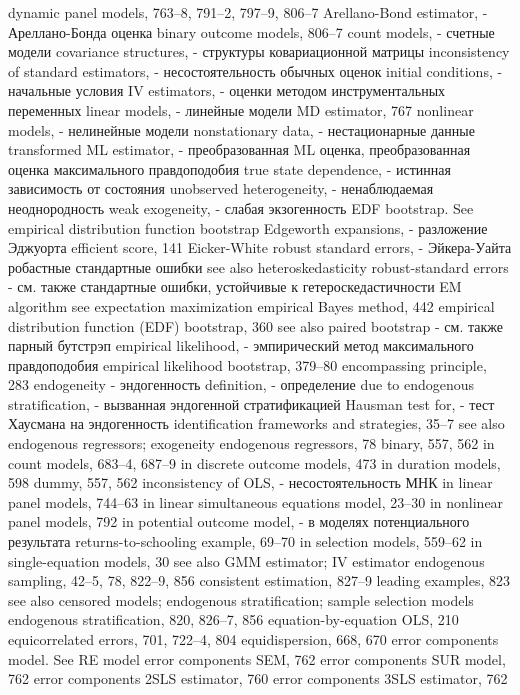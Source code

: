 dynamic panel models, 763–8, 791–2, 797–9, 806–7
Arellano-Bond estimator, - Ареллано-Бонда оценка
binary outcome models, 806–7
count models, - счетные модели
covariance structures, - структуры ковариационной матрицы
inconsistency of standard estimators, - несостоятельность обычных оценок 
initial conditions, - начальные условия
IV estimators, - оценки методом инструментальных переменных
linear models, - линейные модели
MD estimator, 767
nonlinear models, - нелинейные модели 
nonstationary data, - нестационарные данные
transformed ML estimator, - преобразованная ML оценка, преобразованная оценка максимального правдоподобия
true state dependence, - истинная зависимость от состояния
unobserved heterogeneity, - ненаблюдаемая неоднородность
weak exogeneity, - слабая экзогенность
EDF bootstrap. See empirical distribution function bootstrap
Edgeworth expansions, - разложение Эджуорта
efficient score, 141
Eicker-White robust standard errors, - Эйкера-Уайта робастные стандартные ошибки 
see also heteroskedasticity robust-standard errors - см. также стандартные ошибки, устойчивые к гетероскедастичности
EM algorithm see expectation maximization empirical Bayes method, 442
empirical distribution function (EDF) bootstrap, 360
see also paired bootstrap - см. также парный бутстрэп
empirical likelihood, - эмпирический метод максимального правдоподобия
empirical likelihood bootstrap, 379–80 
encompassing principle, 283 
endogeneity - эндогенность
definition, - определение
due to endogenous stratification, - вызванная эндогенной стратификацией
Hausman test for,  - тест Хаусмана на эндогенность
identification frameworks and strategies, 35–7
see also endogenous regressors; exogeneity endogenous regressors, 78
binary, 557, 562
in count models, 683–4, 687–9
in discrete outcome models, 473
in duration models, 598
dummy, 557, 562
inconsistency of OLS, - несостоятельность МНК
in linear panel models, 744–63
in linear simultaneous equations model, 23–30 in nonlinear panel models, 792
in potential outcome model, - в моделях потенциального результата
returns-to-schooling example, 69–70
in selection models, 559–62
in single-equation models, 30
see also GMM estimator; IV estimator
endogenous sampling, 42–5, 78, 822–9, 856 consistent estimation, 827–9
leading examples, 823
see also censored models; endogenous
stratification; sample selection models endogenous stratification, 820, 826–7, 856 equation-by-equation OLS, 210 equicorrelated errors, 701, 722–4, 804 equidispersion, 668, 670
error components model. See RE model error components SEM, 762
error components SUR model, 762 error components 2SLS estimator, 760 error components 3SLS estimator, 762 
